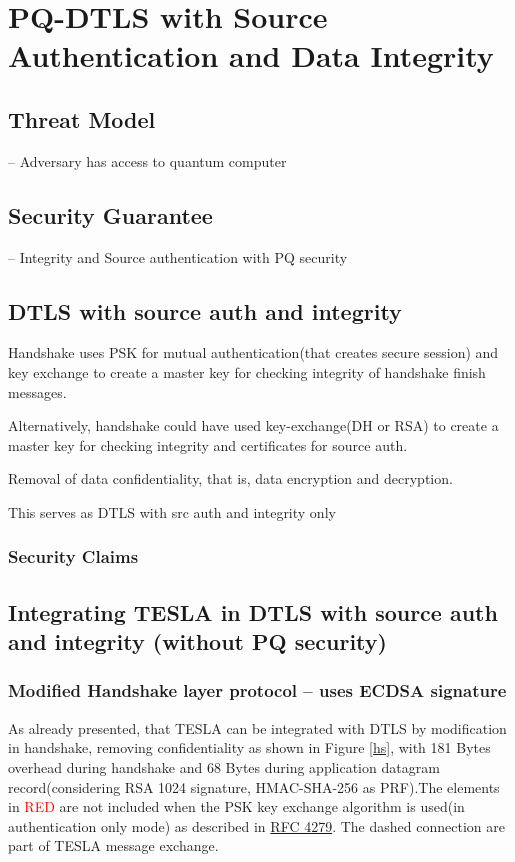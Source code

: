 \chapter{PQ-DTLS with Source Authentication and Data Integrity}

\section{Threat Model}
 – Adversary has access to quantum computer
 
 \section{Security Guarantee }
 – Integrity and Source authentication with PQ security
 
\section{DTLS with source auth and integrity }

Handshake uses PSK for mutual authentication(that creates secure session) and key exchange to create a master key for checking integrity of handshake finish messages.


Alternatively, handshake could have used key-exchange(DH or RSA) to create a master key for checking integrity and certificates for source auth.


Removal of data confidentiality, that is, data encryption and decryption.


This serves as DTLS with src auth and integrity only

\subsection{Security Claims }




\section{Integrating TESLA in DTLS with source auth and integrity (without PQ security)}

\subsection{Modified Handshake layer protocol – uses ECDSA signature }

As already presented, that TESLA can be integrated with DTLS by modification in handshake, removing confidentiality as shown in Figure \ref{hs}, with 181 Bytes overhead during handshake and 68 Bytes during application datagram record(considering RSA 1024 signature, HMAC-SHA-256 as PRF).The elements in \textcolor{red}{RED} are not included when the PSK key exchange algorithm is used(in authentication only mode) as described in \href{https://tools.ietf.org/html/rfc4279#section-2}{RFC 4279}. The dashed connection are part of TESLA message exchange.

